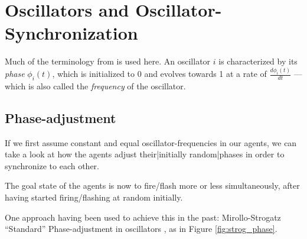 
\section{Oscillators and Oscillator-Synchronization}

	
	
	Much of the terminology from \cite{nymoen_synch} is used here. An oscillator $i$ is characterized by its \textit{phase} $\phi_i(t)$, which is initialized to 0 and evolves towards 1 at a rate of $\frac{d \phi_i(t)}{d t}$ — which is also called the \textit{frequency} of the oscillator.
	
	\subsection{Phase-adjustment}
	
		If we first assume constant and equal oscillator-frequencies in our agents, we can take a look at how the agents adjust their|initially random|phases in order to synchronize to each other.
				
		The goal state of the agents is now to fire/flash more or less simultaneously, after having started firing/flashing at random initially.
		
		One approach having been used to achieve this in the past: Mirollo-Strogatz ``Standard'' Phase-adjustment in oscillators \cite{}, as in Figure \ref{fig:strog_phase}.
		
